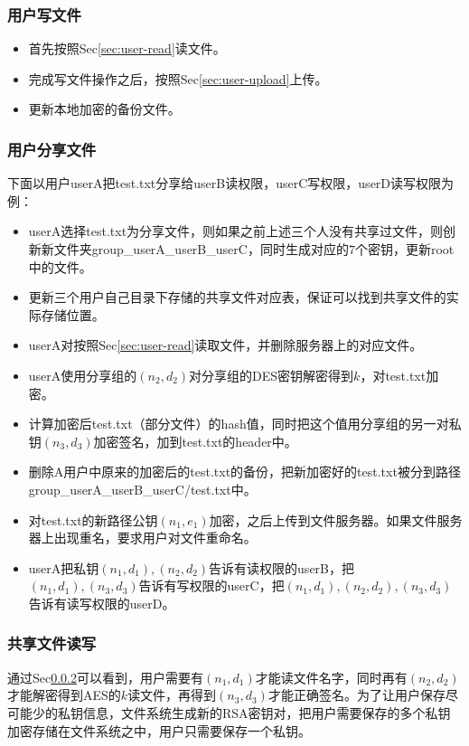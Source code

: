 \documentclass[11pt, oneside]{ctexart}
\begin{document}
\subsubsection{用户写文件}
\begin{itemize}
\item 首先按照Sec\ref{sec:user-read}读文件。
\item 完成写文件操作之后，按照Sec\ref{sec:user-upload}上传。
\item 更新本地加密的备份文件。
\end{itemize}

\subsubsection{用户分享文件}\label{sec:share}
下面以用户userA把test.txt分享给userB读权限，userC写权限，userD读写权限为例：
\begin{itemize}
\item userA选择test.txt为分享文件，则如果之前上述三个人没有共享过文件，则创新新文件夹group\_userA\_userB\_userC，同时生成对应的$7$个密钥，更新root中的文件。
\item 更新三个用户自己目录下存储的共享文件对应表，保证可以找到共享文件的实际存储位置。
\item userA对按照Sec\ref{sec:user-read}读取文件，并删除服务器上的对应文件。
\item userA使用分享组的$(n_2, d_2)$对分享组的DES密钥解密得到$k$，对test.txt加密。
\item 计算加密后test.txt（部分文件）的hash值，同时把这个值用分享组的另一对私钥$(n_3, d_3)$加密签名，加到test.txt的header中。
\item 删除A用户中原来的加密后的test.txt的备份，把新加密好的test.txt被分到路径group\_userA\_userB\_userC/test.txt中。
\item 对test.txt的新路径公钥$(n_1, e_1)$加密，之后上传到文件服务器。如果文件服务器上出现重名，要求用户对文件重命名。
\item userA把私钥$(n_1, d_1), (n_2, d_2)$告诉有读权限的userB，把$(n_1, d_1), (n_3, d_3)$告诉有写权限的userC，把$(n_1, d_1), (n_2, d_2), (n_3, d_3)$告诉有读写权限的userD。
\end{itemize}

\subsubsection{共享文件读写}
通过Sec\ref{sec:share}可以看到，用户需要有$(n_1, d_1)$才能读文件名字，同时再有$(n_2, d_2)$才能解密得到AES的$k$读文件，再得到$(n_3, d_3)$才能正确签名。为了让用户保存尽可能少的私钥信息，文件系统生成新的RSA密钥对，把用户需要保存的多个私钥加密存储在文件系统之中，用户只需要保存一个私钥。
\end{document}
